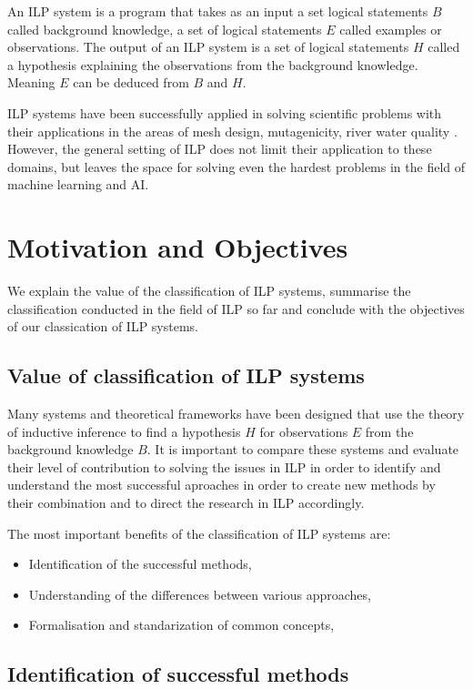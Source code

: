 An ILP system is a program that takes as an input a set logical statements $B$ called background knowledge, a set of logical statements $E$ called examples or observations. The output of an ILP system is a set of logical statements $H$ called a hypothesis explaining the observations from the background knowledge. Meaning $E$ can be deduced from $B$ and $H$.

ILP systems have been successfully applied in solving scientific problems with their applications in the areas of mesh design, mutagenicity, river water quality 
\cite{bratko1995applications}. However, the general setting of ILP does not limit their application to these domains, but leaves the space for solving even the hardest problems in the field of machine learning and AI.
\section{Motivation and Objectives}
We explain the value of the classification of ILP systems, summarise the classification conducted in the field of ILP so far and conclude with the objectives of our classication of ILP systems.

\subsection{Value of classification of ILP systems}
Many systems and theoretical frameworks have been designed that use the theory of inductive inference to find a hypothesis $H$ for observations $E$ from the background knowledge $B$. It is important to compare these systems and evaluate their level of contribution to solving the issues in ILP in order to identify and understand the most successful aproaches in order to create new methods by their combination and to direct the research in ILP accordingly. 

The most important benefits of the classification of ILP systems are:
\begin{itemize}
\item Identification of the successful methods,
\item Understanding of the differences between various approaches,
\item Formalisation and standarization of common concepts,
\end{itemize}

\subsection{Identification of successful methods}
